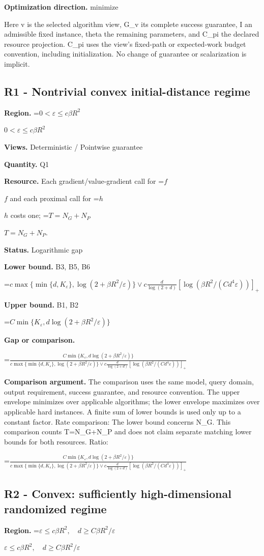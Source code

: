 \documentclass[10pt,a4paper]{article}
\newcommand{\AtlasMath}[1]{\par\begingroup\centering\setbox0=\hbox{$\displaystyle #1$}\ifdim\wd0>1.4\linewidth\typeout{ATLAS WIDE FORMULA: \the\wd0}\fi\ifdim\wd0>\linewidth\resizebox{\linewidth}{!}{\box0}\else\box0\fi\par\endgroup}
\newcommand{\AtlasInlineMath}[1]{\begingroup\setbox0=\hbox{$#1$}\ifdim\wd0>.4\linewidth\endgroup\AtlasMath{#1}\else\endgroup$#1$\fi}
\begin{document}
\textbf{Optimization direction.} minimize

Here v is the selected algorithm view, G\_v its complete success guarantee, I an admissible fixed instance, theta the remaining parameters, and C\_pi the declared resource projection. C\_pi uses the view's fixed-path or expected-work budget convention, including initialization. No change of guarantee or scalarization is implicit.

\subsection{R1 - Nontrivial convex initial-distance regime}
\textbf{Region.} \AtlasInlineMath{0<\varepsilon\le c\beta R^2}

\textbf{Views.} Deterministic / Pointwise guarantee

\textbf{Quantity.} Q1

\textbf{Resource.} Each gradient/value-gradient call for \AtlasInlineMath{f} and each proximal call for \AtlasInlineMath{h} costs one; \AtlasInlineMath{T=N_G+N_P}.

\textbf{Status.} Logarithmic gap

\textbf{Lower bound.} B3, B5, B6

\AtlasMath{c\max\{\min\{d,K_\varepsilon\},\log(2+\beta R^2/\varepsilon)\}\vee c\frac d{\log(2+d)}[\log(\beta R^2/(Cd^4\varepsilon))]_+}
\textbf{Upper bound.} B1, B2

\AtlasMath{C\min\{K_\varepsilon,d\log(2+\beta R^2/\varepsilon)\}}
\textbf{Gap or comparison.} 
\AtlasMath{\frac{C\min\{K_\varepsilon,d\log(2+\beta R^2/\varepsilon)\}}{c\max\{\min\{d,K_\varepsilon\},\log(2+\beta R^2/\varepsilon)\}\vee c\frac d{\log(2+d)}[\log(\beta R^2/(Cd^4\varepsilon))]_+}}


\textbf{Comparison argument.} The comparison uses the same model, query domain, output requirement, success guarantee, and resource convention. The upper envelope minimizes over applicable algorithms; the lower envelope maximizes over applicable hard instances. A finite sum of lower bounds is used only up to a constant factor. Rate comparison: The lower bound concerns N\_G. This comparison counts T=N\_G+N\_P and does not claim separate matching lower bounds for both resources. Ratio: 
\AtlasMath{\frac{C\min\{K_\varepsilon,d\log(2+\beta R^2/\varepsilon)\}}{c\max\{\min\{d,K_\varepsilon\},\log(2+\beta R^2/\varepsilon)\}\vee c\frac d{\log(2+d)}[\log(\beta R^2/(Cd^4\varepsilon))]_+}}


\subsection{R2 - Convex: sufficiently high-dimensional randomized regime}
\textbf{Region.} \AtlasInlineMath{\varepsilon\le c\beta R^2,\quad d\ge C\beta R^2/\varepsilon}
\end{document}
